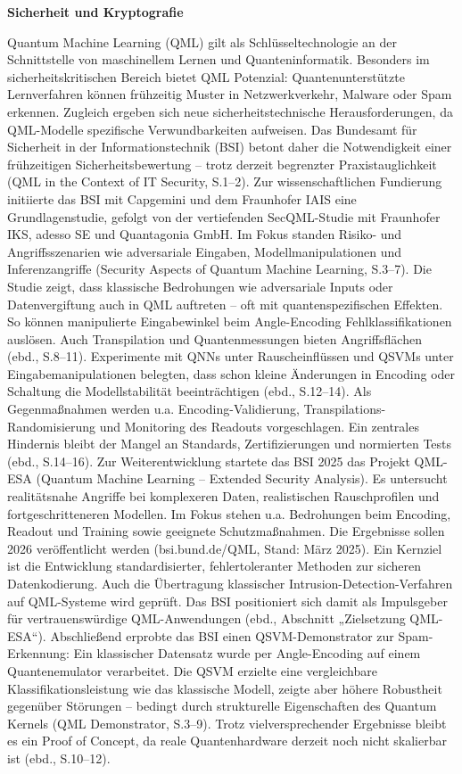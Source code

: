 \vspace{1.5em}
\noindent\textbf{Sicherheit und Kryptografie}

\noindent
Quantum Machine Learning (QML) gilt als Schlüsseltechnologie an der Schnittstelle von maschinellem Lernen und Quanteninformatik. Besonders im sicherheitskritischen Bereich bietet QML Potenzial: Quantenunterstützte Lernverfahren können frühzeitig Muster in Netzwerkverkehr, Malware oder Spam erkennen. Zugleich ergeben sich neue sicherheitstechnische Herausforderungen, da QML-Modelle spezifische Verwundbarkeiten aufweisen. Das Bundesamt für Sicherheit in der Informationstechnik (BSI) betont daher die Notwendigkeit einer frühzeitigen Sicherheitsbewertung – trotz derzeit begrenzter Praxistauglichkeit (QML in the Context of IT Security, S.1–2).
Zur wissenschaftlichen Fundierung initiierte das BSI mit Capgemini und dem Fraunhofer IAIS eine Grundlagenstudie, gefolgt von der vertiefenden SecQML-Studie mit Fraunhofer IKS, adesso SE und Quantagonia GmbH. Im Fokus standen Risiko- und Angriffsszenarien wie adversariale Eingaben, Modellmanipulationen und Inferenzangriffe (Security Aspects of Quantum Machine Learning, S.3–7).
Die Studie zeigt, dass klassische Bedrohungen wie adversariale Inputs oder Datenvergiftung auch in QML auftreten – oft mit quantenspezifischen Effekten. So können manipulierte Eingabewinkel beim Angle-Encoding Fehlklassifikationen auslösen. Auch Transpilation und Quantenmessungen bieten Angriffsflächen (ebd., S.8–11).
Experimente mit QNNs unter Rauscheinflüssen und QSVMs unter Eingabemanipulationen belegten, dass schon kleine Änderungen in Encoding oder Schaltung die Modellstabilität beeinträchtigen (ebd., S.12–14). Als Gegenmaßnahmen werden u.a. Encoding-Validierung, Transpilations-Randomisierung und Monitoring des Readouts vorgeschlagen. Ein zentrales Hindernis bleibt der Mangel an Standards, Zertifizierungen und normierten Tests (ebd., S.14–16).
Zur Weiterentwicklung startete das BSI 2025 das Projekt QML-ESA (Quantum Machine Learning – Extended Security Analysis). Es untersucht realitätsnahe Angriffe bei komplexeren Daten, realistischen Rauschprofilen und fortgeschritteneren Modellen. Im Fokus stehen u.a. Bedrohungen beim Encoding, Readout und Training sowie geeignete Schutzmaßnahmen. Die Ergebnisse sollen 2026 veröffentlicht werden (bsi.bund.de/QML, Stand: März 2025).
Ein Kernziel ist die Entwicklung standardisierter, fehlertoleranter Methoden zur sicheren Datenkodierung. Auch die Übertragung klassischer Intrusion-Detection-Verfahren auf QML-Systeme wird geprüft. Das BSI positioniert sich damit als Impulsgeber für vertrauenswürdige QML-Anwendungen (ebd., Abschnitt „Zielsetzung QML-ESA“).
Abschließend erprobte das BSI einen QSVM-Demonstrator zur Spam-Erkennung: Ein klassischer Datensatz wurde per Angle-Encoding auf einem Quantenemulator verarbeitet. Die QSVM erzielte eine vergleichbare Klassifikationsleistung wie das klassische Modell, zeigte aber höhere Robustheit gegenüber Störungen – bedingt durch strukturelle Eigenschaften des Quantum Kernels (QML Demonstrator, S.3–9). Trotz vielversprechender Ergebnisse bleibt es ein Proof of Concept, da reale Quantenhardware derzeit noch nicht skalierbar ist (ebd., S.10–12).



